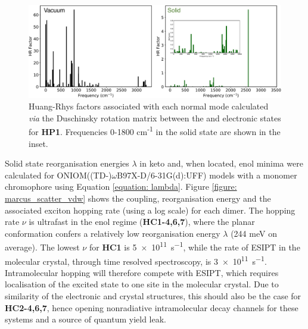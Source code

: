 \begin{figure}[H]
\centering
  \includegraphics[width=0.9\linewidth]{5ConnectingCrystalStructure/HP1_DUSHIN.pdf}
  \caption[Huang-Rhys factors for \textbf{HP1}]{Huang-Rhys factors associated with each normal mode calculated \textit{via} the Duschinsky rotation matrix between the \szero{} and \Kstar{} \sone{} electronic states for \textbf{HP1}. Frequencies 0-1800 cm\textsuperscript{-1} in the solid state are shown in the inset.}
  \label{figure: HP1_DUSHIN}
\end{figure}
Solid state reorganisation energies $\lambda$ in keto and, when located, enol minima were calculated for ONIOM((TD-)$\omega$B97X-D/6-31G(d):UFF) models with a monomer chromophore using Equation \ref{equation: lambda}. Figure \ref{figure: marcus_scatter_vdw} shows the coupling, reorganisation energy and the associated exciton hopping rate (using a log scale) for each dimer. The hopping rate $\nu$ is ultrafast in the enol regime (\textbf{HC1-4,6,7}), where the planar conformation confers a relatively low reorganisation energy $\lambda$ (244 meV on average). The lowest $\nu$ for \textbf{HC1} is \SI{5e11}{s^{-1}}, while the rate of ESIPT in the molecular crystal, through time resolved spectroscopy, is \SI{3e11}{s^{-1}}.\cite{Zahid2017} Intramolecular hopping will therefore compete with ESIPT, which requires localisation of the excited state to one site in the molecular crystal. Due to similarity of the electronic and crystal structures, this should also be the case for \textbf{HC2-4,6,7}, hence opening nonradiative intramolecular decay channels for these systems and a source of quantum yield leak.

